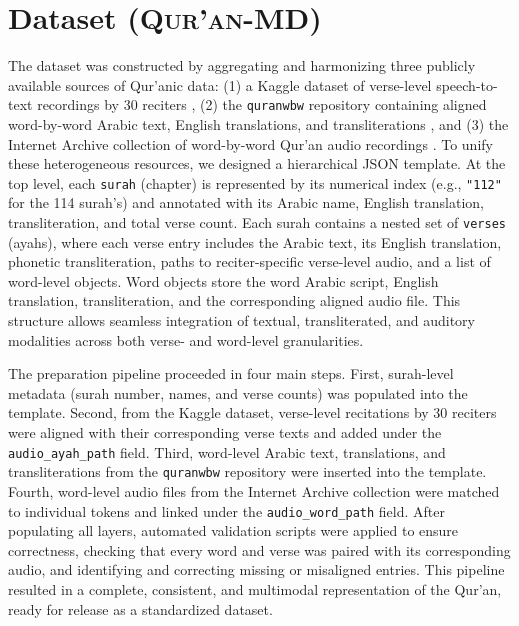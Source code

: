 \section{Dataset (\textsc{Qur’an-MD})}
\label{sec:dataset-preparation}

The dataset was constructed by aggregating and harmonizing three publicly available sources of Qur’anic data: (1) a Kaggle dataset of verse-level speech-to-text recordings by 30 reciters \cite{quran_ayat_speech_kaggle}, (2) the \texttt{quranwbw} repository containing aligned word-by-word Arabic text, English translations, and transliterations \cite{quranwbw_repo}, and (3) the Internet Archive collection of word-by-word Qur’an audio recordings \cite{quran_wordbyword_archive}. To unify these heterogeneous resources, we designed a hierarchical JSON template. At the top level, each \texttt{surah} (chapter) is represented by its numerical index (e.g., \texttt{"112"} for the 114 surah's) and annotated with its Arabic name, English translation, transliteration, and total verse count. Each surah contains a nested set of \texttt{verses} (ayahs), where each verse entry includes the Arabic text, its English translation, phonetic transliteration, paths to reciter-specific verse-level audio, and a list of word-level objects. Word objects store the word Arabic script, English translation, transliteration, and the corresponding aligned audio file. This structure allows seamless integration of textual, transliterated, and auditory modalities across both verse- and word-level granularities.  

The preparation pipeline proceeded in four main steps. First, surah-level metadata (surah number, names, and verse counts) was populated into the template. Second, from the Kaggle dataset, verse-level recitations by 30 reciters were aligned with their corresponding verse texts and added under the \texttt{audio\_ayah\_path} field. Third, word-level Arabic text, translations, and transliterations from the \texttt{quranwbw} repository were inserted into the template. Fourth, word-level audio files from the Internet Archive collection were matched to individual tokens and linked under the \texttt{audio\_word\_path} field. After populating all layers, automated validation scripts were applied to ensure correctness, checking that every word and verse was paired with its corresponding audio, and identifying and correcting missing or misaligned entries. This pipeline resulted in a complete, consistent, and multimodal representation of the Qur’an, ready for release as a standardized dataset.

